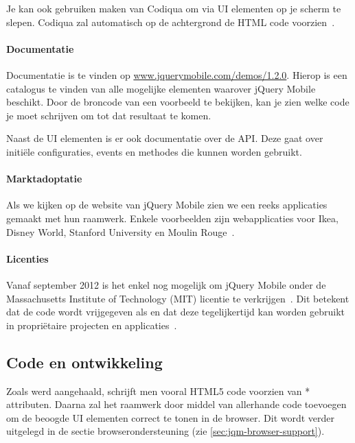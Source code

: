 Je kan ook gebruiken maken van Codiqua om via  UI elementen op je scherm te slepen. Codiqua zal automatisch op de achtergrond de HTML code voorzien~\cite{Sperry2012}.

\paragraph{Documentatie}
Documentatie is te vinden op \url{www.jquerymobile.com/demos/1.2.0}. Hierop is een catalogus te vinden van alle mogelijke elementen waarover jQuery Mobile beschikt. Door de broncode van een voorbeeld te bekijken, kan je zien welke code je moet schrijven om tot dat resultaat te komen.

Naast de UI elementen is er ook documentatie over de API. Deze gaat over initiële configuraties, events en methodes die kunnen worden gebruikt.


\paragraph{Marktadoptatie}
Als we kijken op de website van jQuery Mobile zien we een reeks applicaties gemaakt met hun raamwerk. 
Enkele voorbeelden zijn webapplicaties voor Ikea, Disney World, Stanford University en Moulin Rouge~\cite{JQuery2012a}. 

\paragraph{Licenties}
Vanaf september 2012 is het enkel nog mogelijk om jQuery Mobile onder de Massachusetts Institute of Technology (MIT) licentie te verkrijgen~\cite{Dmethvin2012}. 
Dit betekent dat de code wordt vrijgegeven als  en dat deze tegelijkertijd kan worden gebruikt in propriëtaire projecten en applicaties~\cite{PhilDutson2012}.

\subsection{Code en ontwikkeling}
Zoals werd aangehaald, schrijft men vooral HTML5 code voorzien van * attributen. 
Daarna zal het raamwerk door middel van  allerhande code toevoegen om de beoogde UI elementen correct te tonen in de browser. Dit wordt verder uitgelegd in de sectie browserondersteuning (zie \ref{sec:jqm-browser-support}).

